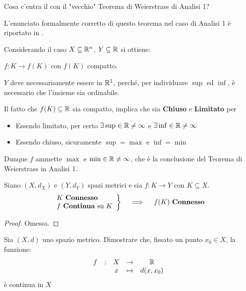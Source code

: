 \begin{exercise}
	\label{ex:weier_analisi_1}
	Cosa c'entra il  con il "vecchio" Teorema di Weierstrass di Analisi 1?
	\begin{note}
		L'enunciato formalmente corretto di questo teorema nel caso di Analisi 1 è riportato in .
	\end{note}
	\begin{solution}
		Considerando il caso $X \subseteq \mathbb{R}^n$, $Y \subseteq \mathbb{R}$ si ottiene:
		\begin{center}
			$f:K \to f(K)$ con $f(K)$ compatto.
		\end{center}
		\begin{note}
			$Y$ deve necessariamente essere in $\mathbb{R}^1$, perché, per individuare $\sup$ ed $\inf$, è necessario che l'insieme sia ordinabile.
		\end{note}
		Il fatto che $f(K) \subseteq \mathbb{R}$ sia compatto, implica che sia \textbf{Chiuso} e \textbf{Limitato} per 
		\begin{itemize}
			\item Essendo limitato, per certo $\exists \sup \in \mathbb{R} \neq \infty$ e $\exists \inf \in \mathbb{R} \neq \infty$
			\item Essendo chiuso, sicuramente $\sup = \max$ e $\inf = \min$
		\end{itemize}
		Dunque $f$ ammette $\max$ e $\min \in \mathbb{R} \neq \infty$, che è la conclusione del Teorema di Weierstrass in Analisi 1.
	\end{solution}
\end{exercise}
\begin{proposition}
	\label{prop:f_di_conn_cont_e_conn}
	Siano $(X,d_X)$ e $(Y,d_Y)$ spazi metrici e sia $f:K \to Y$ con $K \subseteq X$.
	\begin{equation*}
		\left.
		\begin{array}{l}
		K \text{ \textbf{Connesso}} \\
		f \text{ \textbf{Continua} su } K
		\end{array}
		\right\}
		\quad \implies \quad
		f(K) \text{ \textbf{Connesso}}
	\end{equation*}
	\begin{proof}
		Omessa.
	\end{proof}
\end{proposition}
\begin{exercise}
	Sia $(X,d)$ uno spazio metrico. Dimostrare che, fissato un punto $x_0 \in X$, la funzione:
	\[\begin{array}{ccccc} {f} & : & {X} & \to & {\mathbb{R}} \\ & & {x} & \mapsto & {d(x,x_0)} \\ \end{array}\]
	è continua in $X$
\end{exercise}

